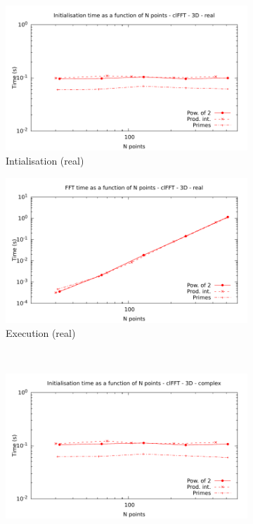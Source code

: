 \documentclass[12pt, a4paper]{article}
\begin{document}
\begin{figure}[H]
\captionsetup{width=0.8\linewidth}
\centering
\begin{subfigure}{.5\textwidth}
\centering
\includegraphics[width=.9\linewidth]{graphs/fft-opencl-3d-pow2-r-init.pdf}
\caption{Intialisation (real)}
\label{FFTCL1DRI}
\end{subfigure}%
\begin{subfigure}{.5\textwidth}
\centering
\includegraphics[width=.9\linewidth]{graphs/fft-opencl-3d-pow2-r-exec.pdf}
\caption{Execution (real)}
\label{FFTCL1DRE}
\end{subfigure}\\
\begin{subfigure}{.5\textwidth}
\centering
\includegraphics[width=.9\linewidth]{graphs/fft-opencl-3d-pow2-c-init.pdf}

\end{subfigure}
\end{figure}
\end{document}
